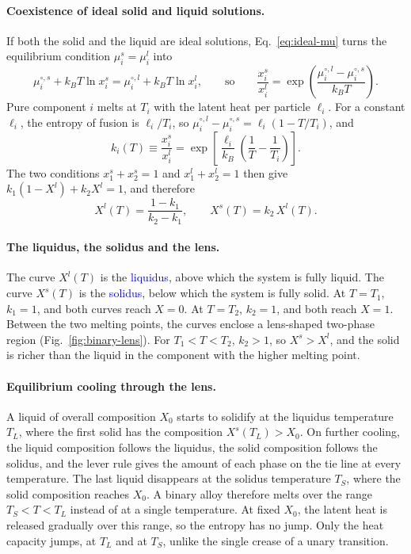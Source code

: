 \paragraph{Coexistence of ideal solid and liquid solutions.}
If both the solid and the liquid are ideal solutions,
Eq.~\eqref{eq:ideal-mu} turns the equilibrium condition
$\mu_i^s=\mu_i^l$ into
\begin{equation*}
    \mu_i^{\circ,s}+k_BT\ln x_i^s=\mu_i^{\circ,l}+k_BT\ln x_i^l,
    \qquad\text{so}\qquad
    \frac{x_i^s}{x_i^l}=\exp\!\left(\frac{\mu_i^{\circ,l}-\mu_i^{\circ,s}}{k_BT}\right).
\end{equation*}
Pure component $i$ melts at $T_i$ with the latent heat per particle
$\ell_i$. For a constant $\ell_i$, the entropy of fusion is $\ell_i/T_i$,
so $\mu_i^{\circ,l}-\mu_i^{\circ,s}=\ell_i(1-T/T_i)$, and
\begin{equation}
    \boxed{k_i(T)\equiv\frac{x_i^s}{x_i^l}
    =\exp\!\left[\frac{\ell_i}{k_B}\left(\frac{1}{T}-\frac{1}{T_i}\right)\right].}
\end{equation}
The two conditions $x_1^s+x_2^s=1$ and $x_1^l+x_2^l=1$ then give
$k_1(1-X^l)+k_2X^l=1$, and therefore
\begin{equation}
    \boxed{X^l(T)=\frac{1-k_1}{k_2-k_1},\qquad X^s(T)=k_2\,X^l(T).}
\end{equation}

\paragraph{The liquidus, the solidus and the lens.}
The curve $X^l(T)$ is the \textcolor{blue}{liquidus}, above which the system
is fully liquid. The curve $X^s(T)$ is the \textcolor{blue}{solidus}, below
which the system is fully solid. At $T=T_1$, $k_1=1$, and both curves reach
$X=0$. At $T=T_2$, $k_2=1$, and both reach $X=1$. Between the two melting
points, the curves enclose a lens-shaped two-phase region
(Fig.~\ref{fig:binary-lens}). For $T_1<T<T_2$, $k_2>1$, so
$X^s>X^l$, and the solid is richer than the liquid in the component with
the higher melting point.

\paragraph{Equilibrium cooling through the lens.}
A liquid of overall composition $X_0$ starts to solidify at the liquidus
temperature $T_L$, where the first solid has the composition $X^s(T_L)>X_0$.
On further cooling, the liquid composition follows the liquidus, the solid
composition follows the solidus, and the lever rule gives the amount of each
phase on the tie line at every temperature. The last liquid disappears at
the solidus temperature $T_S$, where the solid composition reaches $X_0$.
A binary alloy therefore melts over the range $T_S<T<T_L$ instead of at a
single temperature. At fixed $X_0$, the latent heat is released gradually
over this range, so the entropy has no jump. Only the heat capacity jumps,
at $T_L$ and at $T_S$, unlike the single crease of a unary transition.

